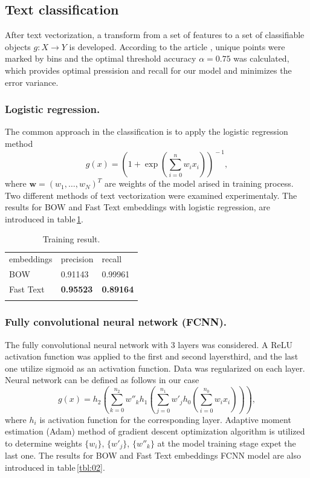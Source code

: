 \documentclass[12pt]{jpconf}
\begin{document}
\subsection{Text classification}
After text vectorization, a transform from a set of features to a set of classifiable objects $g: X \rightarrow Y$ is developed.
According to the article \cite{Bommannavar2014,Yang2014}, unique points were marked by bins and the optimal threshold accuracy $\alpha = 0.75$ was calculated, which provides optimal pressision and recall for our model and minimizes the error variance.

\subsubsection*{Logistic regression.}
The common approach in the classification is to apply the logistic regression method
$$
g(x) = \left(1 + \exp{ \left( \sum_{i=0}^n w_i x_i  \right) }\right)^{\!\!-1}\!\!\!\!,
$$
where $\mathbf{w}=(w_1,\ldots, w_N)^T$ are weights of the model arised in training process.
Two different methods of text vectorization were examined experimentaly.
The results for BOW and Fast Text embeddings with logistic regression, are introduced in table\,\ref{tbl:01}.

\begin{table}[h!]
	\centering
	\caption{\label{tbl:01}Training result.}
	\begin{center}
		\begin{tabular}{lll}
			\br
			embeddings & precision & recall \\
			\mr
			BOW & 0.91143 & 0.99961 \\ \hline
			Fast Text & \bf 0.95523 & \bf 0.89164 \\ 
			\br
		\end{tabular}
	\end{center}
\end{table}

\subsubsection*{Fully convolutional neural network (FCNN).}

The fully convolutional neural network with 3 layers was considered. A \textsf{ReLU} activation function was applied to the first and second layersthird, and the last one utilize \textsf{sigmoid} as an activation function. Data was regularized on each layer. Neural network can be defined as follows in our case
$$
g(x) = h_2 \left(\sum_{k=0}^{n_2} w''_k h_1\left(\sum_{j=0}^{n_1} w'_j h_0\left( \sum_{i=0}^{n_0} w_i x_i \right)\right)\right),
$$
where $h_i$ is activation function for the corresponding layer. Adaptive moment estimation (Adam) method of gradient descent optimization algorithm is utilized to determine weights $\{w_i\}$, $\{w'_j\}$, $\{w''_k\}$ at the model training stage expet the last one.
The results for BOW and Fast Text embeddings FCNN model are also introduced in table\,\ref{tbl:02}.
\end{document}

